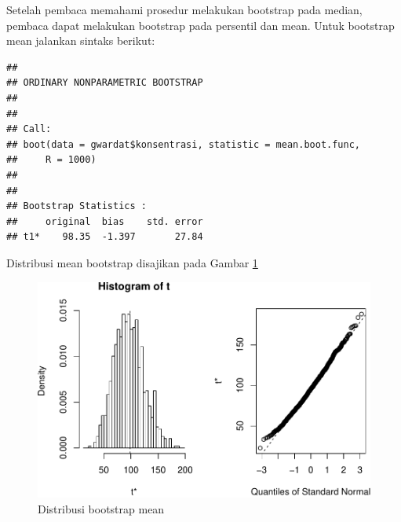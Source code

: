 \documentclass[]{book}
\newenvironment{Shaded}{\begin{snugshade}}{\end{snugshade}}
\newcommand{\KeywordTok}[1]{\textcolor[rgb]{0.13,0.29,0.53}{\textbf{#1}}}
\newcommand{\DataTypeTok}[1]{\textcolor[rgb]{0.13,0.29,0.53}{#1}}
\newcommand{\DecValTok}[1]{\textcolor[rgb]{0.00,0.00,0.81}{#1}}
\newcommand{\StringTok}[1]{\textcolor[rgb]{0.31,0.60,0.02}{#1}}
\newcommand{\CommentTok}[1]{\textcolor[rgb]{0.56,0.35,0.01}{\textit{#1}}}
\newcommand{\ControlFlowTok}[1]{\textcolor[rgb]{0.13,0.29,0.53}{\textbf{#1}}}
\newcommand{\OperatorTok}[1]{\textcolor[rgb]{0.81,0.36,0.00}{\textbf{#1}}}
\newcommand{\NormalTok}[1]{#1}
\begin{document}
Setelah pembaca memahami prosedur melakukan bootstrap pada median,
pembaca dapat melakukan bootstrap pada persentil dan mean. Untuk
bootstrap mean jalankan sintaks berikut:

\begin{Shaded}
\end{Shaded}

\begin{verbatim}
## 
## ORDINARY NONPARAMETRIC BOOTSTRAP
## 
## 
## Call:
## boot(data = gwardat$konsentrasi, statistic = mean.boot.func, 
##     R = 1000)
## 
## 
## Bootstrap Statistics :
##     original  bias    std. error
## t1*    98.35  -1.397       27.84
\end{verbatim}

Distribusi mean bootstrap disajikan pada Gambar \ref{fig:boot2}

\begin{figure}

{\centering \includegraphics[width=0.65\linewidth]{EnvStat_files/figure-latex/boot2-1} 

}

\caption{Distribusi bootstrap mean}\label{fig:boot2}
\end{figure}
\end{document}
